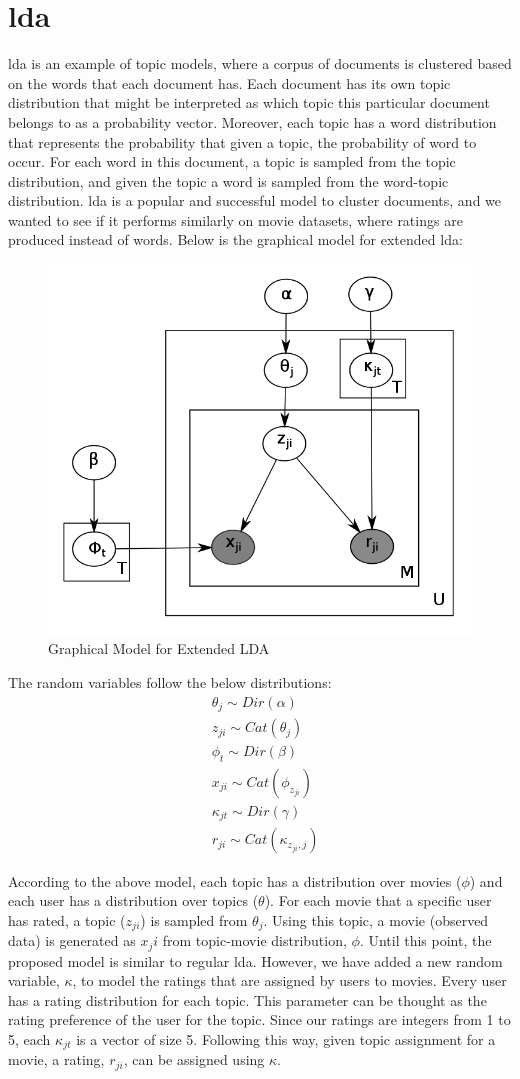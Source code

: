 \documentclass{article} %
\begin{document}
\section{\acrlong{lda}}
\gls{lda} \cite{lda} is an example of topic models, where a corpus of documents is 
clustered based on the words that each document has. Each document has its own 
topic distribution that might be interpreted as which topic this particular 
document belongs to as a probability vector. Moreover, each topic has a word 
distribution that represents the probability that given a topic, the probability 
of word to occur. For each word in this document, a topic is sampled from the topic 
distribution, and given the topic a word is sampled from the word-topic 
distribution. \gls{lda} is a popular and successful model to cluster documents, 
and we wanted to see if it performs similarly on movie datasets, where ratings 
are produced instead of words. Below is the graphical model for extended 
\gls{lda}: 
\begin{figure}[h]
  \begin{center}
    \includegraphics[width=.4\textwidth]{E-LDA.png}
    \caption{Graphical Model for Extended LDA}
    \label{fig:plot1}
  \end{center}
\end{figure}

The random variables follow the below distributions:
\begin{align*}
  &\theta_j \sim Dir(\alpha)\\
  &z_{ji} \sim Cat(\theta_j)\\
  &\phi_t \sim Dir(\beta)\\
  &x_{ji} \sim Cat(\phi_{z_{ji}}) \\
  &\kappa_{jt} \sim Dir(\gamma)\\
  &r_{ji} \sim Cat(\kappa_{z_{ji},j})
\end{align*}

According to the above model, each topic has a distribution over movies ($\phi$) 
and each user has a distribution over topics ($\theta$). For each movie that a 
specific user has rated, a topic ($z_{ji}$) is sampled from $\theta_j$. Using 
this topic, a movie (observed data) is generated as $x_ji$ from topic-movie 
distribution, $\phi$. Until this point, the proposed model is similar to regular 
\gls{lda}. However, we have added a new random variable, $\kappa$, to model the 
ratings that are assigned by users to movies. Every user has a rating 
distribution for each topic. This parameter can be thought as the rating 
preference of the user for the topic. Since our ratings are integers from 1 to 
5, each $\kappa_{jt}$ is a vector of size 5. Following this way, given topic 
assignment for a movie, a rating, $r_{ji}$, can be assigned using $\kappa$. 
\end{document}
